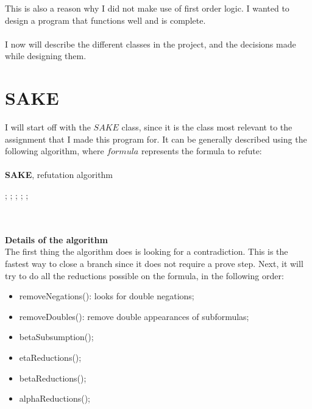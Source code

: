 \documentclass{article}
\begin{document}
This is also a reason why I did not make use of first order logic. I wanted to design a program that functions well and is complete. \\\\I now will describe the different classes in the project, and the decisions made while designing them.
\newpage
\section{SAKE}
I will start off with the $SAKE$ class, since it is the class most relevant to the assignment that I made this program for. It can be generally described using the following algorithm, where $formula$ represents the formula to refute:\\\\
{\bf SAKE}, refutation algorithm

\begin{algorithmic}
\REPEAT
{}
\ENDIF
{};
;
;
\ENDIF
{}
;
\ENDIF
{};
\ENDIF
{}
\end{algorithmic}
$\ $\\\\
{\bf Details of the algorithm}\\
The first thing the algorithm does is looking for a contradiction. This is the fastest way to close a branch since it does not require a prove step. Next, it will try to do all the reductions possible on the formula, in the following order:
\begin{itemize}
\item removeNegations(): looks for double negations;
\item removeDoubles(): remove double appearances of subformulas;
\item betaSubsumption();
\item etaReductions();
\item betaReductions();
\item alphaReductions();
\end{itemize}
\end{document}
